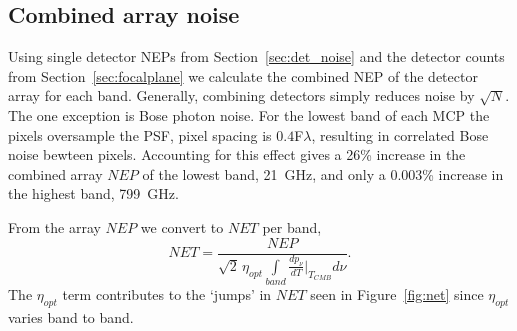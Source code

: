 \documentclass[]{spie}  %
\begin{document}

\subsection{Combined  array noise}

Using single detector NEPs from Section~\ref{sec:det_noise} and the detector counts from Section~\ref{sec:focalplane} we 
calculate the combined NEP of the detector array for each band.  Generally, combining detectors simply reduces noise by $\sqrt{N}$.  The one 
exception is Bose photon noise. For the lowest band of each MCP the pixels oversample the PSF, pixel spacing is $0.4$F$\lambda$, resulting in correlated 
Bose noise bewteen pixels.  Accounting for this effect gives a 26\% increase in the combined array $NEP$ of the lowest band, 21~GHz, and only 
a 0.003\% increase in the highest band, 799~GHz.  

From the array $NEP$ we convert to $NET$ per band,
\begin{equation}
\label{eq:NET}
NET = \frac{NEP}{\sqrt{2} \, \eta_{opt} \int\limits_{band}\frac{dp_{\nu}}{dT}\Bigr|_{T_{CMB}} d\nu }.
\end{equation} 
The $\eta_{opt}$ term contributes to the `jumps' in $NET$ seen in Figure~\ref{fig:net} since $\eta_{opt}$ varies band to band.  
\end{document}
